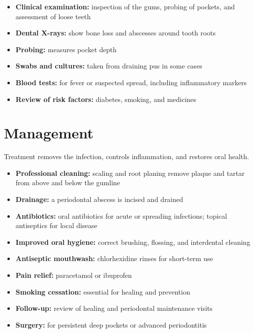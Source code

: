 \begin{itemize}
    \item \textbf{Clinical examination:} inspection of the gums, probing of pockets, and assessment of loose teeth
    \item \textbf{Dental X-rays:} show bone loss and abscesses around tooth roots
    \item \textbf{Probing:} measures pocket depth
    \item \textbf{Swabs and cultures:} taken from draining pus in some cases
    \item \textbf{Blood tests:} for fever or suspected spread, including inflammatory markers
    \item \textbf{Review of risk factors:} diabetes, smoking, and medicines
\end{itemize}

\section*{Management}
Treatment removes the infection, controls inflammation, and restores oral health.

\begin{itemize}
    \item \textbf{Professional cleaning:} scaling and root planing remove plaque and tartar from above and below the gumline
    \item \textbf{Drainage:} a periodontal abscess is incised and drained
    \item \textbf{Antibiotics:} oral antibiotics for acute or spreading infections; topical antiseptics for local disease
    \item \textbf{Improved oral hygiene:} correct brushing, flossing, and interdental cleaning
    \item \textbf{Antiseptic mouthwash:} chlorhexidine rinses for short-term use
    \item \textbf{Pain relief:} paracetamol or ibuprofen
    \item \textbf{Smoking cessation:} essential for healing and prevention
    \item \textbf{Follow-up:} review of healing and periodontal maintenance visits
    \item \textbf{Surgery:} for persistent deep pockets or advanced periodontitis
\end{itemize}

